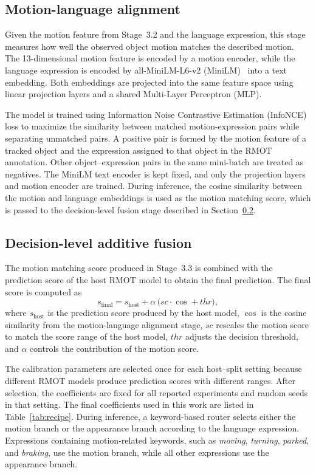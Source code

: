 \documentclass[sigconf,anonymous,nonacm]{acmart}
\begin{document}
\subsection{Motion-language alignment}
\label{sec:align}

Given the motion feature from Stage~3.2 and the language expression, this stage measures how well the observed object motion matches the described motion. The 13-dimensional motion feature is encoded by a motion encoder, while the language expression is encoded by all-MiniLM-L6-v2 (MiniLM)~\cite{sbert} into a text embedding. Both embeddings are projected into the same feature space using linear projection layers and a shared Multi-Layer Perceptron (MLP).

The model is trained using Information Noise Contrastive Estimation (InfoNCE)~\cite{infonce} loss to maximize the similarity between matched motion-expression pairs while separating unmatched pairs. A positive pair is formed by the motion feature of a tracked object and the expression assigned to that object in the RMOT annotation. Other object--expression pairs in the same mini-batch are treated as negatives. The MiniLM text encoder is kept fixed, and only the projection layers and motion encoder are trained. During inference, the cosine similarity between the motion and language embeddings is used as the motion matching score, which is passed to the decision-level fusion stage described in Section~\ref{sec:fusion}.

\subsection{Decision-level additive fusion}
\label{sec:fusion}

The motion matching score produced in Stage~3.3 is combined with the prediction score of the host RMOT model to obtain the final prediction. The final score is computed as
\begin{equation}
s_{\mathrm{final}} = s_{\mathrm{host}} + \alpha\,\bigl(\mathit{sc}\cdot\cos + \mathit{thr}\bigr),
\label{eq:fusion}
\end{equation}
where $s_{\mathrm{host}}$ is the prediction score produced by the host model, $\cos$ is the cosine similarity from the motion-language alignment stage, $\mathit{sc}$ rescales the motion score to match the score range of the host model, $\mathit{thr}$ adjusts the decision threshold, and $\alpha$ controls the contribution of the motion score.

The calibration parameters are selected once for each host--split setting because different RMOT models produce prediction scores with different ranges. After selection, the coefficients are fixed for all reported experiments and random seeds in that setting. The final coefficients used in this work are listed in Table~\ref{tab:recipe}. During inference, a keyword-based router selects either the motion branch or the appearance branch according to the language expression. Expressions containing motion-related keywords, such as \emph{moving}, \emph{turning}, \emph{parked}, and \emph{braking}, use the motion branch, while all other expressions use the appearance branch.
\end{document}
